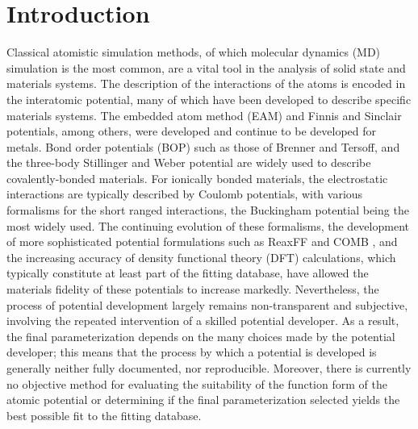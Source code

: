 \section{Introduction}
Classical atomistic simulation methods, of which molecular dynamics (MD) simulation\cite{allen1987_md,haile1992_md,lesar2013_md,frenkel2002_md} is the most common, are a vital tool in the analysis of solid state and materials systems. 
The description of the interactions of the atoms is encoded in the interatomic potential, many of which have been developed to describe specific materials systems. 
The embedded atom method (EAM)\cite{daw1983_eam,daw1984_eam,daw1993_eam_review,foiles2012_eam_review} and Finnis and Sinclair\cite{finnis1984_fs} potentials, among others, were developed and continue to be developed for metals. 
Bond order potentials (BOP) such as those of Brenner\cite{brenner1989_bop,brenner2002_rebo} and Tersoff\cite{tersoff1988_tersoff}, and the three-body Stillinger and Weber\cite{stillinger1985_sw} potential are widely used to describe covalently-bonded materials. 
For ionically bonded materials, the electrostatic interactions are typically described by Coulomb potentials, with various formalisms for the short ranged interactions, the Buckingham potential being the most widely used.\cite{lewis1985_buck,gale1996_buck}
The continuing evolution of these formalisms, the development of more sophisticated potential formulations such as ReaxFF\cite{vanduin2001_reaxff,senftle2016_reaxff} and COMB \cite{liang2013_comb_1,liang2013_comb_2}, and the increasing accuracy of density functional theory (DFT) calculations, which typically constitute at least part of the fitting database, have allowed the materials fidelity of these potentials to increase markedly. 
Nevertheless, the process of potential development largely remains non-transparent and subjective, involving the repeated intervention of a skilled potential developer.\cite{brenner2000_fitting,martinez2013_fitting,martinez2016_posmat} 
As a result, the final parameterization depends on the many choices made by the potential developer; this means that the process by which a potential is developed is generally neither fully documented, nor reproducible. 
Moreover, there is currently no objective method for evaluating the suitability of the function form of the atomic potential or determining if the final parameterization selected yields the best possible fit to the fitting database.

